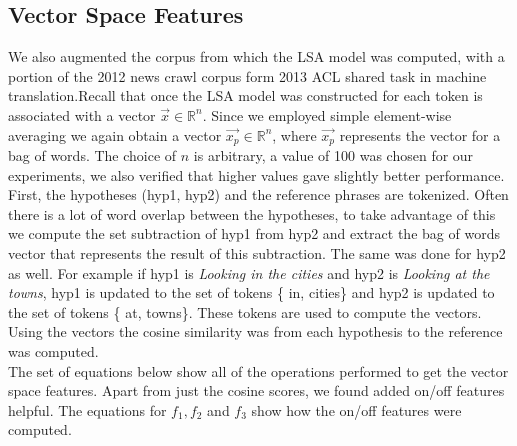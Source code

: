 \documentclass[11pt]{article}
\begin{document}
\subsection{Vector Space Features}
 We also augmented the corpus from which the LSA model was computed,
with a portion of the 2012 news crawl corpus form 2013 ACL shared task in
machine translation.Recall that once the LSA model was constructed for each 
token is associated with a vector $\vec{x}\in \mathbb{R}^n$.
Since we employed simple element-wise averaging we again obtain a vector
$\vec{x_p} \in \mathbb{R}^n$, where $\vec{x_p}$ represents the vector for a bag
of words. The choice of $n$ is arbitrary, a value of 100 was chosen for
our experiments, we also verified that higher values gave slightly better
performance.\\
First, the hypotheses (hyp1, hyp2) and the reference phrases are
tokenized. Often there is a lot of word overlap between the hypotheses, to take
advantage of this we compute the set subtraction of hyp1 from hyp2 and extract
the bag of words vector that represents the result of this subtraction. The same
was done for hyp2 as well. For example if hyp1 is \emph{Looking in the cities}
and hyp2 is \emph{Looking at the towns}, hyp1 is updated to the set of tokens \{
in, cities\} and hyp2 is updated to the set of tokens \{ at, towns\}. These
tokens are used to compute the vectors. Using the vectors the cosine similarity
was from each hypothesis to the reference was computed.\\
 The set of equations
below show all of the operations performed to get the vector space features.
Apart from just the cosine scores, we found added on/off features helpful. The
equations for $f_1, f_2$ and $f_3$ show how the on/off features were computed.
\end{document}
